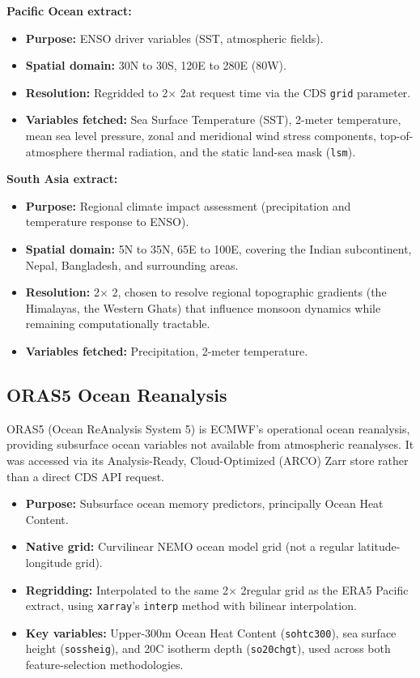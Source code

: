 \textbf{Pacific Ocean extract:}
\begin{itemize}
    \item \textbf{Purpose:} ENSO driver variables (SST, atmospheric fields).
    \item \textbf{Spatial domain:} 30\degree N to 30\degree S, 120\degree E to 280\degree E (80\degree W).
    \item \textbf{Resolution:} Regridded to 2\degree $\times$ 2\degree at request time via the CDS \texttt{grid} parameter.
    \item \textbf{Variables fetched:} Sea Surface Temperature (SST), 2-meter temperature, mean sea level pressure, zonal and meridional wind stress components, top-of-atmosphere thermal radiation, and the static land-sea mask (\texttt{lsm}).
\end{itemize}

\textbf{South Asia extract:}
\begin{itemize}
    \item \textbf{Purpose:} Regional climate impact assessment (precipitation and temperature response to ENSO).
    \item \textbf{Spatial domain:} 5\degree N to 35\degree N, 65\degree E to 100\degree E, covering the Indian subcontinent, Nepal, Bangladesh, and surrounding areas.
    \item \textbf{Resolution:} 2\degree $\times$ 2\degree, chosen to resolve regional topographic gradients (the Himalayas, the Western Ghats) that influence monsoon dynamics while remaining computationally tractable.
    \item \textbf{Variables fetched:} Precipitation, 2-meter temperature.
\end{itemize}

\subsection*{ORAS5 Ocean Reanalysis}
ORAS5 (Ocean ReAnalysis System 5) is ECMWF's operational ocean reanalysis, providing subsurface ocean variables not available from atmospheric reanalyses. It was accessed via its Analysis-Ready, Cloud-Optimized (ARCO) Zarr store rather than a direct CDS API request.
\begin{itemize}
    \item \textbf{Purpose:} Subsurface ocean memory predictors, principally Ocean Heat Content.
    \item \textbf{Native grid:} Curvilinear NEMO ocean model grid (not a regular latitude-longitude grid).
    \item \textbf{Regridding:} Interpolated to the same 2\degree $\times$ 2\degree regular grid as the ERA5 Pacific extract, using \texttt{xarray}'s \texttt{interp} method with bilinear interpolation.
    \item \textbf{Key variables:} Upper-300m Ocean Heat Content (\texttt{sohtc300}), sea surface height (\texttt{sossheig}), and 20\degree C isotherm depth (\texttt{so20chgt}), used across both feature-selection methodologies.
\end{itemize}

